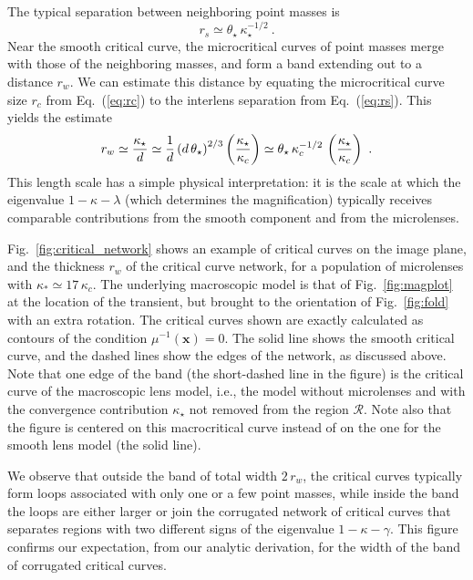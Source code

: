 \documentclass{aastex6}
\newcommand{\bt}[1]{\mathbf #1}
\newcommand{\refeq}[1]{Eq.~(\ref{eq:#1})}
\newcommand{\reffig}[1]{Fig.~\ref{fig:#1}}
\newcommand{\be}{\begin{equation}}
\newcommand{\ee}{\end{equation}}
\newcommand{\ba}{\begin{eqnarray}}
\newcommand{\ea}{\end{eqnarray}}
\begin{document}
 The typical separation between neighboring point masses is
\be
\label{eq:rs}
r_s \simeq \theta_\star \, \kappa^{-1/2}_\star ~. 
\ee 
Near the smooth critical curve, the microcritical curves of point masses merge with those of the neighboring masses, and form a band extending out to a distance $r_w$. We can estimate this distance by equating the microcritical curve size $r_c$ from \refeq{rc} to the interlens separation from \refeq{rs}. This yields the estimate
\ba
\label{eq:rw}
r_w \simeq \frac{\kappa_\star}{d} \simeq
 {1\over d} \left( d\, \theta_\star \right)^{2/3} 
\left( \frac{\kappa_\star}{\kappa_c} \right) 
\simeq \theta_\star\, \kappa_c^{-1/2} \,
\left( \frac{\kappa_\star}{\kappa_c} \right)~.
\ea
This length scale has a simple physical interpretation: it is the scale at which the eigenvalue $1 - \kappa - \lambda$ (which determines the magnification) typically receives comparable contributions from the smooth component and from the microlenses. %

\reffig{critical_network} shows an example of critical curves on the image plane, and the thickness $r_w$ of the critical curve network, for a population of microlenses with $\kappa_* \simeq 17 \, \kappa_c$. The underlying macroscopic model is that of \reffig{magplot} at the location of the transient, but brought to the orientation of \reffig{fold} with an extra rotation. The critical curves shown are exactly calculated as contours of the condition $\mu^{-1}(\bt x) = 0$. The solid line shows the smooth critical curve, and the dashed lines show the edges of the network, as discussed above. Note that one edge of the band (the short-dashed line in the figure) is the critical curve of the macroscopic lens model, i.e., the model without microlenses and with the convergence contribution $\kappa_\star$ not removed from the region $\mathcal{R}$. Note also that the figure is centered on this macrocritical curve instead of on the one for the smooth lens model (the solid line). 

We observe that outside the band of total width $2\,r_w$, the critical curves typically form loops associated with only one or a few point masses, while inside the band the loops are either larger or join the corrugated network of critical curves that separates regions with two different signs of the eigenvalue $1-\kappa-\gamma$. This figure confirms our expectation, from our analytic derivation, for the width of the band of corrugated critical curves. 
\end{document}
